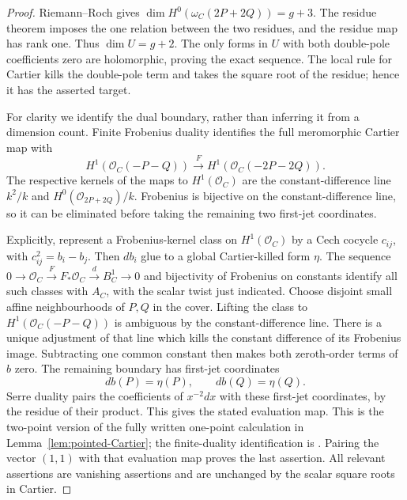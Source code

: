 \begin{proof}
Riemann--Roch gives $\dim H^0(\omega_C(2P+2Q))=g+3$.
The residue theorem imposes the one relation between the two residues,
and the residue map has rank one. Thus $\dim U=g+2$.
The only forms in $U$ with both double-pole coefficients zero are
holomorphic, proving the exact sequence. The local rule for Cartier
kills the double-pole term and takes the square root of the residue;
hence it has the asserted target.

For clarity we identify the dual boundary, rather than inferring it
from a dimension count. Finite Frobenius duality identifies the full
meromorphic Cartier map with
\[
 H^1(\mathcal O_C(-P-Q))\xrightarrow{F}
 H^1(\mathcal O_C(-2P-2Q)).
\]
The respective kernels of the maps to $H^1(\mathcal O_C)$ are the
constant-difference line $k^2/k$ and
$H^0(\mathcal O_{2P+2Q})/k$. Frobenius is bijective on the
constant-difference line, so it can be eliminated before taking the
remaining two first-jet coordinates.

Explicitly, represent a Frobenius-kernel class on $H^1(\mathcal O_C)$
by a Cech cocycle $c_{ij}$, with $c_{ij}^2=b_i-b_j$.
Then $db_i$ glue to a global Cartier-killed form $\eta$.
The sequence
$0\to\mathcal O_C\xrightarrow F F_*\mathcal O_C
 \xrightarrow d B_C^1\to0$
and bijectivity of Frobenius on constants identify all such classes
with $A_C$, with the scalar twist just indicated. Choose disjoint
small affine neighbourhoods of $P,Q$ in the cover. Lifting the class
to $H^1(\mathcal O_C(-P-Q))$ is ambiguous by the
constant-difference line. There is a unique adjustment of that line
which kills the constant difference of its Frobenius image.
Subtracting one common constant then makes both zeroth-order terms
of $b$ zero. The remaining boundary has first-jet coordinates
\[
                   db(P)=\eta(P),\qquad db(Q)=\eta(Q).
\]
Serre duality pairs the coefficients of $x^{-2}dx$ with these
first-jet coordinates, by the residue of their product. This gives
the stated evaluation map. This is the two-point version of the
fully written one-point calculation in Lemma~\ref{lem:pointed-Cartier};
the finite-duality identification is
\cite[Lemma~1.3.6 and Proposition~1.3.7, pp.~26--27]{BrionKumar2005}.
Pairing the vector $(1,1)$ with that evaluation map proves the last
assertion. All relevant assertions are vanishing assertions and are
unchanged by the scalar square roots in Cartier.
\end{proof}

